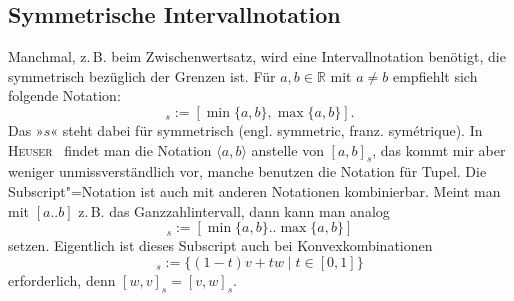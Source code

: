 \documentclass[a4paper,11pt,fleqn,twoside,BCOR=16mm]{scrartcl}
\newcommand{\R}{\mathbb R}
\newcommand{\citename}[1]{\textsc{#1}}
\begin{document}
\subsection{Symmetrische Intervallnotation}
Manchmal, z.\,B. beim Zwischenwertsatz, wird eine
Intervallnotation benötigt, die symmetrisch bezüglich der Grenzen
ist. Für $a,b\in\R$ mit $a\ne b$ empfiehlt sich folgende Notation:
\begin{equation}
[a,b]_s := [\min\{a,b\},\max\{a,b\}].
\end{equation}
Das »$s$« steht dabei für symmetrisch (engl. symmetric,
franz. symétrique). In \citename{Heuser}~\cite{Heuser}\label{bref:Heuser}
findet man die Notation $\langle a,b\rangle$ anstelle von $[a,b]_s$,
das kommt mir aber weniger unmissverständlich vor, manche benutzen die
Notation für Tupel. Die Subscript"=Notation ist auch mit
anderen Notationen kombinierbar. Meint man mit $[a..b]$
z.\,B. das Ganzzahlintervall, dann kann man analog
\begin{equation}
[a..b]_s := [\min\{a,b\}..\max\{a,b\}]
\end{equation}
setzen. Eigentlich ist dieses Subscript auch bei Konvexkombinationen
\begin{equation}
[v,w]_s := \{(1-t)v+t w\mid t\in [0,1]\}
\end{equation}
erforderlich, denn $[w,v]_s=[v,w]_s$.
\end{document}
